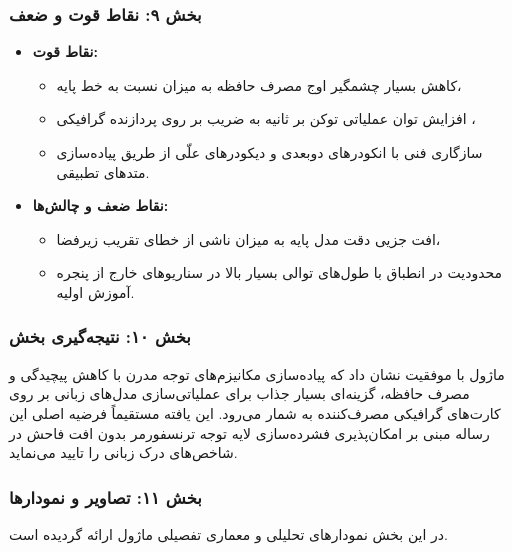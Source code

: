 \subsubsection*{بخش ۹: نقاط قوت و ضعف }
\begin{itemize}
    \item \textbf{نقاط قوت:}
    \begin{itemize}
        \item کاهش بسیار چشمگیر اوج مصرف حافظه به میزان  نسبت به خط پایه،
        \item افزایش توان عملیاتی توکن بر ثانیه به ضریب  بر روی پردازنده گرافیکی ،
        \item سازگاری فنی با انکودرهای دوبعدی و دیکودرهای علّی از طریق پیاده‌سازی متدهای تطبیقی.
    \end{itemize}
    \item \textbf{نقاط ضعف و چالش‌ها:}
    \begin{itemize}
        \item افت جزیی دقت مدل پایه به میزان  ناشی از خطای تقریب زیرفضا،
        \item محدودیت در انطباق با طول‌های توالی بسیار بالا در سناریوهای خارج از پنجره آموزش اولیه.
    \end{itemize}
\end{itemize}

\subsubsection*{بخش ۱۰: نتیجه‌گیری بخش }
ماژول  با موفقیت نشان داد که پیاده‌سازی مکانیزم‌های توجه مدرن با کاهش پیچیدگی و مصرف حافظه، گزینه‌ای بسیار جذاب برای عملیاتی‌سازی مدل‌های زبانی بر روی کارت‌های گرافیکی مصرف‌کننده  به شمار می‌رود. این یافته مستقیماً فرضیه اصلی این رساله مبنی بر امکان‌پذیری فشرده‌سازی لایه توجه ترنسفورمر بدون افت فاحش در شاخص‌های درک زبانی را تایید می‌نماید.

\subsubsection*{بخش ۱۱: تصاویر و نمودارها }
در این بخش نمودارهای تحلیلی و معماری تفصیلی ماژول ارائه گردیده است.
